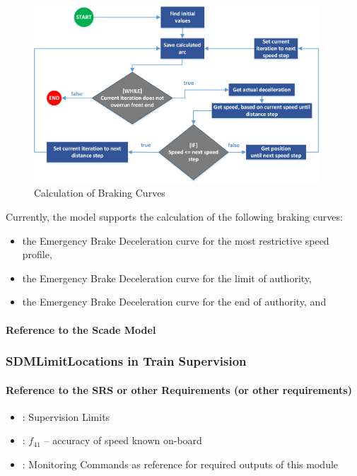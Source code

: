 \begin{figure}
\centering
\includegraphics[width=0.95\textwidth]{../images/EBD_CalcAlgorithm.png}
\caption{Calculation of Braking Curves}\label{fig:bc_calc}
\end{figure}

Currently, the model supports the calculation of the following braking curves:
\begin{itemize}
	\item the Emergency Brake Deceleration curve for the most restrictive speed profile,
	\item the Emergency Brake Deceleration curve for the limit of authority,
	\item the Emergency Brake Deceleration curve for the end of authority, and
\end{itemize}

\paragraph{Reference to the Scade Model}

\subsubsection{SDMLimitLocations in Train Supervision}
\paragraph{Reference to the SRS or other Requirements (or other requirements)}
\begin{itemize}
	\item \cite[Chapt.~3.13.9]{subset-026}: Supervision Limits 
	\item \cite[Chapt.~5.3.1.2]{subset-041}: $f_{41}$ -- accuracy of speed known on-board
	\item \cite[Chapt.~3.13.10]{subset-026}: Monitoring Commands as reference for required outputs of this module
\end{itemize}

